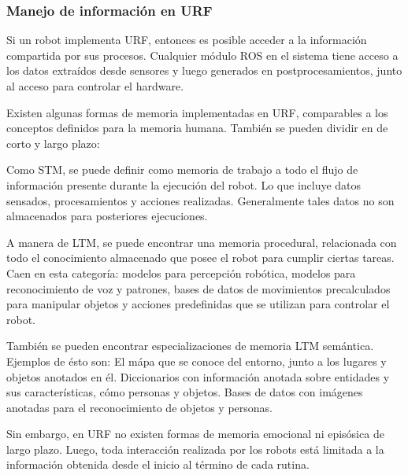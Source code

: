 

\subsubsection{Manejo de informaci\'on en URF}

Si un robot implementa URF, entonces es posible acceder a la informaci\'on compartida por sus procesos. Cualquier m\'odulo ROS en el sistema tiene acceso a los datos extra\'idos desde sensores y luego generados en postprocesamientos, junto al acceso para controlar el hardware.

Existen algunas formas de memoria implementadas en URF, comparables a los conceptos definidos para la memoria humana. Tambi\'en se pueden dividir en de corto y largo plazo:

Como STM, se puede definir como memoria de trabajo a todo el flujo de informaci\'on presente durante la ejecuci\'on del robot. Lo que incluye datos sensados, procesamientos y acciones realizadas. Generalmente tales datos no son almacenados para posteriores ejecuciones.

A manera de LTM, se puede encontrar una memoria procedural, relacionada con todo el conocimiento almacenado que posee el robot para cumplir ciertas tareas. Caen en esta categor\'ia: modelos para percepci\'on rob\'otica, modelos para reconocimiento de voz y patrones, bases de datos de movimientos precalculados para manipular objetos y acciones predefinidas que se utilizan para controlar el robot.

Tambi\'en se pueden encontrar especializaciones de memoria LTM sem\'antica. Ejemplos de \'esto son: El m\'apa que se conoce del entorno, junto a los lugares y objetos anotados en \'el. Diccionarios con informaci\'on anotada sobre entidades y sus caracter\'isticas, c\'omo personas y objetos. Bases de datos con im\'agenes anotadas para el reconocimiento de objetos y personas. 

Sin embargo, en URF no existen formas de memoria emocional ni epis\'osica de largo plazo. Luego, toda interacci\'on realizada por los robots est\'a limitada a la informaci\'on obtenida desde el inicio al t\'ermino de cada rutina.



